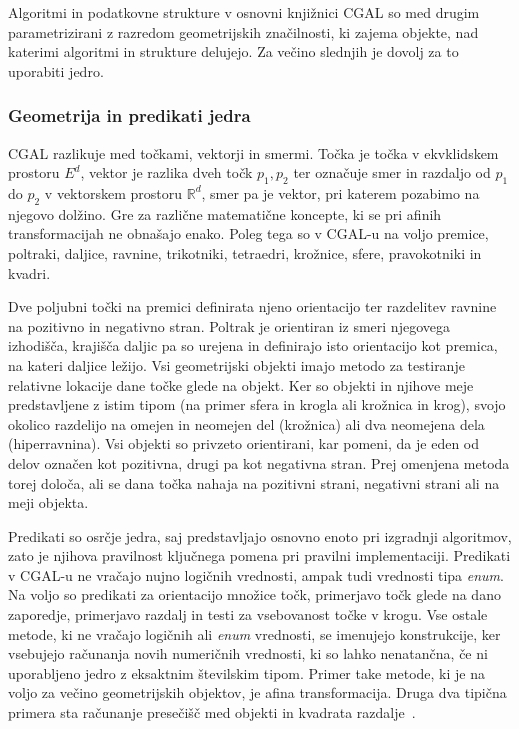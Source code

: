\documentclass[a4paper, 12pt]{book}
\newcommand{\RR}{\ensuremath{\mathbb R}}  %
\begin{document}
Algoritmi in podatkovne strukture v osnovni knjižnici CGAL so med drugim parametrizirani z razredom geometrijskih značilnosti, ki zajema objekte, nad katerimi algoritmi in strukture
delujejo. Za večino slednjih je dovolj za to uporabiti jedro.

\subsubsection{Geometrija in predikati jedra}
CGAL razlikuje med točkami, vektorji in smermi. Točka je točka v ekvklidskem prostoru $E^d$, vektor je razlika dveh točk $p_1, p_2$ ter označuje smer in razdaljo od $p_1$ do $p_2$ v vektorskem prostoru $\RR^d$, smer pa je vektor, pri katerem pozabimo na njegovo dolžino. Gre za različne matematične koncepte, ki se pri afinih transformacijah ne obnašajo enako.
Poleg tega so v CGAL-u na voljo premice, poltraki, daljice, ravnine, trikotniki, tetraedri,  krožnice, sfere, pravokotniki in kvadri.

Dve poljubni točki na premici definirata njeno orientacijo ter razdelitev ravnine na pozitivno in negativno stran. Poltrak je orientiran iz smeri njegovega izhodišča, krajišča daljic pa so urejena in definirajo isto orientacijo kot premica, na kateri daljice ležijo. Vsi geometrijski objekti imajo metodo za testiranje relativne lokacije dane točke glede na objekt. Ker so objekti in njihove meje predstavljene z istim tipom (na primer sfera in krogla ali krožnica in krog), svojo okolico razdelijo na omejen in neomejen del (krožnica) ali dva neomejena dela (hiperravnina). Vsi objekti so privzeto orientirani, kar pomeni, da je eden od delov označen kot pozitivna, drugi pa kot negativna stran. Prej omenjena metoda torej določa, ali se dana točka nahaja na pozitivni strani, negativni strani ali na meji objekta. 

\bigbreak
Predikati so osrčje jedra, saj predstavljajo osnovno enoto  pri izgradnji algoritmov, zato je njihova pravilnost ključnega pomena pri pravilni implementaciji. Predikati v CGAL-u ne vračajo nujno logičnih vrednosti, ampak tudi vrednosti tipa \textit{enum}. Na voljo so predikati za orientacijo množice točk, primerjavo točk glede na dano zaporedje, primerjavo razdalj in testi za vsebovanost točke v krogu. Vse ostale metode, ki ne vračajo logičnih ali \textit{enum} vrednosti, se imenujejo konstrukcije, ker vsebujejo računanja novih numeričnih vrednosti, ki so lahko nenatančna, če ni uporabljeno jedro z eksaktnim številskim tipom. Primer take metode, ki je na voljo za večino geometrijskih objektov, je afina transformacija. Druga dva tipična primera sta računanje presečišč med objekti in kvadrata razdalje~\cite{cgal:bfghhkps-lgk23-16b}.
\end{document}
